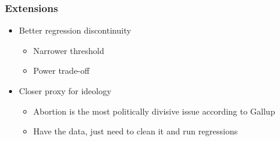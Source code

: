 \documentclass{beamer}
\begin{document}
\begin{frame}
\frametitle{Extensions}
\begin{itemize}

\item Better regression discontinuity
\begin{itemize}
\item Narrower threshold
\item Power trade-off
\end{itemize}

\item Closer proxy for ideology
\begin{itemize}
\item Abortion is the most politically divisive issue according to Gallup
\item Have the data, just need to clean it and run regressions
\end{itemize}

\end{itemize}

\end{frame}
\end{document}
